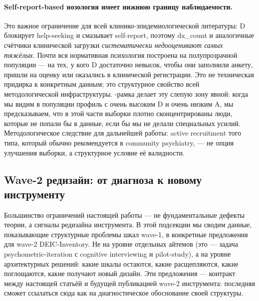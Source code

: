 \paragraph{Self-report-based нозология имеет нижнюю границу наблюдаемости.} Это важное ограничение для всей клинико-эпидемиологической литературы: D блокирует help-seeking и смазывает self-report, поэтому dx\_count и аналогичные счётчики клинической загрузки \emph{систематически недооценивают самых тяжёлых}. Почти вся нормативная психология построена на полупрозрачной популяции --- на тех, у кого D достаточно невысок, чтобы они заполнили анкету, пришли на оценку или оказались в клинической регистрации. Это не техническая придирка к конкретным данным; это структурное свойство всей методологической инфраструктуры. \DEIC{}-рамка делает эту слепую зону явной: когда мы видим в популяции профиль с очень высоким D и очень низким A, мы предсказываем, что в этой части выборки плотно сконцентрированы люди, которые не попали бы в данные, если бы мы не делали специальных усилий. Методологическое следствие для дальнейшей работы: active recruitment того типа, который обычно рекомендуется в community psychiatry, --- не опция улучшения выборки, а структурное условие её валидности.

\subsection{Wave-2 редизайн: от диагноза к новому инструменту}
\label{subsec:wave2_design}

Большинство ограничений настоящей работы --- не фундаментальные дефекты теории, а сигналы редизайна инструмента. В этой подсекции мы сводим данные, показывающие структурные проблемы шкал wave-1, в конкретные предложения для wave-2 DEIC-Inventory. Не на уровне отдельных айтемов (это --- задача psychometric-iteration с cognitive interviewing и pilot-study), а на уровне архитектурных решений: какие шкалы остаются, какие расщепляются, какие поглощаются, какие получают новый дизайн. Эти предложения --- контракт между настоящей статьёй и будущей публикацией wave-2 инструмента: последняя сможет ссылаться сюда как на диагностическое обоснование своей структуры.

